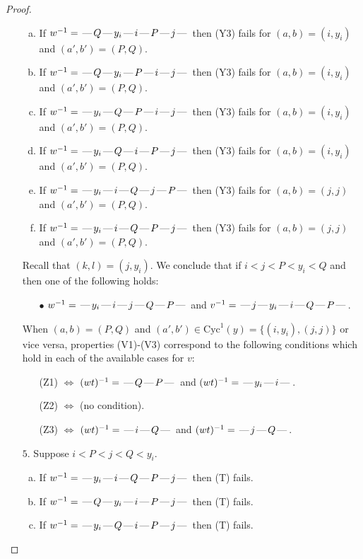 \documentclass[10pt]{article}
\theoremstyle{definition}
\theoremstyle{definition}
\def\dash{\text{\hspace{0.5mm}---\hspace{0.5mm}}}
\def\Cyc{\mathrm{Cyc}}
\begin{document}
\begin{proof}
\begin{enumerate}
\begin{enumerate}[(a)]
\item If $w^{-1} = \dash Q\dash y_i\dash i\dash P\dash j\dash $ then (Y3) fails for $(a,b)=(i,y_i)$ and $(a',b')=(P,Q)$.
\item If $w^{-1} = \dash Q\dash y_i\dash P\dash i\dash j\dash $ then (Y3) fails for $(a,b)=(i,y_i)$ and $(a',b')=(P,Q)$.
\item If $w^{-1} = \dash y_i\dash Q\dash P\dash i\dash j\dash $ then (Y3) fails for $(a,b)=(i,y_i)$ and $(a',b')=(P,Q)$.
\item If $w^{-1} = \dash y_i\dash Q\dash i\dash P\dash j\dash $ then (Y3) fails for $(a,b)=(i,y_i)$ and $(a',b')=(P,Q)$.
\item If $w^{-1} = \dash y_i\dash i\dash Q\dash j\dash P\dash $ then (Y3) fails for $(a,b)=(j,j)$ and $(a',b')=(P,Q)$.
\item If $w^{-1} = \dash y_i\dash i\dash Q\dash P\dash j\dash $ then (Y3) fails for $(a,b)=(j,j)$ and $(a',b')=(P,Q)$.
\end{enumerate}
Recall that $(k,l) = (j,y_i)$.
We conclude that if $i < j < P < y_i < Q$ and then one of the following holds:
\begin{enumerate}
\item[$\bullet$] $w^{-1} = \dash y_i\dash i\dash j\dash Q\dash P\dash $ and $v^{-1} = \dash j\dash y_i\dash i\dash Q\dash P\dash $.
\end{enumerate}
When $(a,b)= (P,Q)$ and $(a',b')\in \Cyc^1(y)=\{(i,y_i),(j,j)\}$ or vice versa,
properties (V1)-(V3) correspond to the following conditions which hold in
each of the available cases for $v$:
\begin{enumerate}
\item[](Z1) $\Leftrightarrow$ $(wt)^{-1} = \dash Q \dash P \dash$  and $(wt)^{-1} = \dash y_i \dash i \dash$.
\item[](Z2) $\Leftrightarrow$ (no condition).
\item[](Z3) $\Leftrightarrow$ $(wt)^{-1} = \dash i \dash Q \dash$  and $(wt)^{-1} = \dash j \dash Q \dash$.
\end{enumerate}
\item[$5$.] Suppose $i < P < j < Q < y_i$.
\begin{enumerate}[(a)]
\item If $w^{-1} = \dash y_i\dash i\dash Q\dash P\dash j\dash $ then (T) fails.
\item If $w^{-1} = \dash Q\dash y_i\dash i\dash P\dash j\dash $ then (T) fails.
\item If $w^{-1} = \dash y_i\dash Q\dash i\dash P\dash j\dash $ then (T) fails.

\end{enumerate}
\end{enumerate}
\end{proof}
\end{document}
